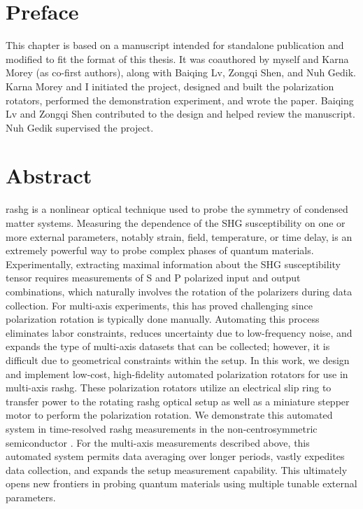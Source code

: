 \section{Preface}

This chapter is based on a manuscript intended for standalone publication and modified to fit the format of this thesis.
It was coauthored by myself and Karna Morey (as co-first authors), along with Baiqing Lv, Zongqi Shen, and Nuh Gedik.
Karna Morey and I initiated the project, designed and built the polarization rotators, performed the demonstration experiment, and wrote the paper.
Baiqing Lv and Zongqi Shen contributed to the design and helped review the manuscript.
Nuh Gedik supervised the project.

\section{Abstract}

\gls{rashg} is a nonlinear optical technique used to probe the symmetry of condensed matter systems. 
Measuring the dependence of the SHG susceptibility on one or more external parameters, notably strain, field, temperature, or time delay, is an extremely powerful way to probe complex phases of quantum materials. 
Experimentally, extracting maximal information about the SHG susceptibility tensor requires measurements of S and P polarized input and output combinations, which naturally involves the rotation of the polarizers during data collection.  
For multi-axis experiments, this has proved challenging since polarization rotation is typically done manually. 
Automating this process eliminates labor constraints, reduces uncertainty due to low-frequency noise, and expands the type of multi-axis datasets that can be collected; however, it is difficult due to geometrical constraints within the setup.
In this work, we design and implement low-cost, high-fidelity automated polarization rotators for use in multi-axis \gls{rashg}.
These polarization rotators utilize an electrical slip ring to transfer power to the rotating \gls{rashg} optical setup as well as a miniature stepper motor to perform the polarization rotation.
We demonstrate this automated system in time-resolved \gls{rashg} measurements in the non-centrosymmetric semiconductor . 
For the multi-axis measurements described above, this automated system permits data averaging over longer periods, vastly expedites data collection, and expands the setup measurement capability.
This ultimately opens new frontiers in probing quantum materials using multiple tunable external parameters.

